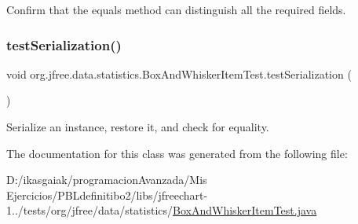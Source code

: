 Confirm that the equals method can distinguish all the required fields. \mbox{\label{classorg_1_1jfree_1_1data_1_1statistics_1_1_box_and_whisker_item_test_ada19738b98305ad963282587f779d2d8}} 
\subsubsection{\texorpdfstring{test\+Serialization()}{testSerialization()}}
{\footnotesize\ttfamily void org.\+jfree.\+data.\+statistics.\+Box\+And\+Whisker\+Item\+Test.\+test\+Serialization (\begin{DoxyParamCaption}{ }\end{DoxyParamCaption})}

Serialize an instance, restore it, and check for equality. 

The documentation for this class was generated from the following file\+:\begin{DoxyCompactItemize}
\item 
D\+:/ikasgaiak/programacion\+Avanzada/\+Mis Ejercicios/\+P\+B\+Ldefinitibo2/libs/jfreechart-\/1../tests/org/jfree/data/statistics/\mbox{\hyperlink{_box_and_whisker_item_test_8java}{Box\+And\+Whisker\+Item\+Test.\+java}}\end{DoxyCompactItemize}
